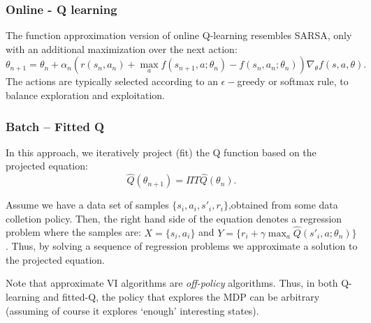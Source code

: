 \subsubsection{Online - Q learning}
The function approximation version of online Q-learning resembles SARSA, only with an additional maximization over the next action:
\begin{equation*}
    \theta_{n+1} = \theta_n + \alpha_n \left( r(s_n,a_n) + \max_a f(s_{n+1},a;\theta_n) - f(s_{n},a_{n}; \theta_n) \right) \nabla_{\theta} f(s,a,\theta).
\end{equation*}
The actions are typically selected according to an $\epsilon-$greedy or softmax rule, to balance exploration and exploitation.

\subsubsection{Batch -- Fitted Q}

In this approach, we iteratively project (fit) the Q function based on the projected equation:
\begin{equation*}
    \hat{Q}(\theta_{n+1}) = \Pi T \hat{Q}(\theta_{n}).
\end{equation*}

Assume we have a data set of samples $\{s_i,a_i,s'_i,r_i\}$,obtained from some data colletion policy. Then, the right hand side of the equation denotes a regression problem where the samples are: $X = \{s_i,a_i\}$ and $Y = \{ r_i + \gamma \max_a \hat{Q}(s'_i, a;\theta_{n})\}$. Thus, by solving a sequence of regression problems we approximate a solution to the projected equation.

Note that approximate VI algorithms are \emph{off-policy} algorithms. Thus, in both Q-learning and fitted-Q, the policy that explores the MDP can be arbitrary (assuming of course it explores `enough' interesting states).